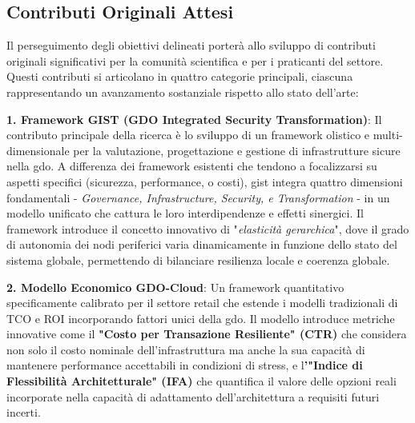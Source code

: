 
\subsection{Contributi Originali Attesi}

\label{ssec:contributi_originali}
Il perseguimento degli obiettivi delineati porterà allo sviluppo di contributi originali significativi per la comunità scientifica e per i praticanti del settore. Questi contributi si articolano in quattro categorie principali, ciascuna rappresentando un avanzamento sostanziale rispetto allo stato dell'arte:

\textbf{1. Framework GIST (GDO Integrated Security Transformation)}: Il contributo principale della ricerca è lo sviluppo di un framework olistico e multi-dimensionale per la valutazione, progettazione e gestione di infrastrutture sicure nella \gls{gdo}. A differenza dei framework esistenti che tendono a focalizzarsi su aspetti specifici (sicurezza, performance, o costi), \gls{gist} integra quattro dimensioni fondamentali - \emph{Governance, Infrastructure, Security, e Transformation} - in un modello unificato che cattura le loro interdipendenze e effetti sinergici. Il framework introduce il concetto innovativo di "\emph{elasticità gerarchica}", dove il grado di autonomia dei nodi periferici varia dinamicamente in funzione dello stato del sistema globale, permettendo di bilanciare resilienza locale e coerenza globale.

\textbf{2. Modello Economico GDO-Cloud}: Un framework quantitativo specificamente calibrato per il settore retail che estende i modelli tradizionali di TCO e ROI incorporando fattori unici della \gls{gdo}. Il modello introduce metriche innovative come il\textbf{ "Costo per Transazione Resiliente" (CTR)} che considera non solo il costo nominale dell'infrastruttura ma anche la sua capacità di mantenere performance accettabili in condizioni di stress, e l\textbf{'"Indice di Flessibilità Architetturale" (IFA)} che quantifica il valore delle opzioni reali incorporate nella capacità di adattamento dell'architettura a requisiti futuri incerti.

